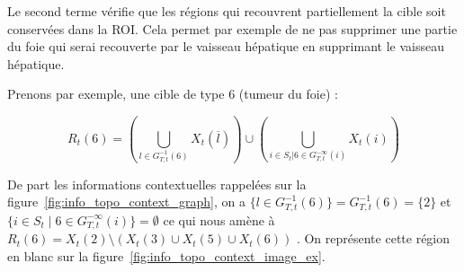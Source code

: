 	Le second terme vérifie que les régions qui recouvrent partiellement la cible soit conservées dans la ROI. Cela permet par exemple de ne pas supprimer une partie du foie qui serai recouverte par le vaisseau hépatique en supprimant le vaisseau hépatique.

	Prenons par exemple, une cible de type $6$ (tumeur du foie) :

	\begin{equation}
		R_t(6)=\left(\bigcup_{l\in G_{T,t}^{-1}(6)}X_t(\overline{l})\right) \cup \left(\bigcup_{i\in S_t| 6\in G_{T,t}^{-\infty}(i)}X_t(i) \right)
		\label{eq:roi_ex}
	\end{equation}

	De part les informations contextuelles rappelées sur la figure~\ref{fig:info_topo_context_graph}, on a $\{l \in G_{T,t}^{-1}(6)\} = G_{T,t}^{-1}(6) = \{2\}$ et $\{i \in S_t \;|\;6\in G_{T,t}^{-\infty}(i) \}=\emptyset$ ce qui nous amène à $R_t(6)=X_t(2) \setminus (X_t(3) \cup X_t(5) \cup X_t(6))$ . On  représente cette région en blanc sur la figure~\ref{fig:info_topo_context_image_ex}.




